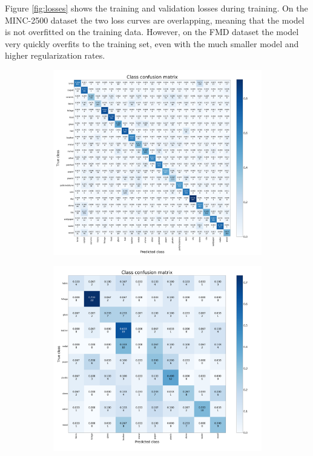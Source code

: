\documentclass[12pt,a4paper]{article}
\begin{document}
	Figure \ref{fig:losses} shows the training and validation losses during training. On the MINC-2500 dataset the two loss curves are overlapping, meaning that the model is not overfitted on the training data. However, on the FMD dataset the model very quickly overfits to the training set, even with the much smaller model and higher regularization rates.
	
	\begin{figure}
		\centering
		\vspace{-15mm}
		\begin{subfigure}[c]{0.95\linewidth}
			\includegraphics[width=\linewidth]{imgs/conf_minc}
			\caption{}
			\label{fig:confminc}
			\vspace{2mm}
		\end{subfigure}
		\begin{subfigure}[c]{0.7\linewidth}
			\includegraphics[width=\linewidth]{imgs/conf_fmd}

\end{subfigure}
\end{figure}
\end{document}
